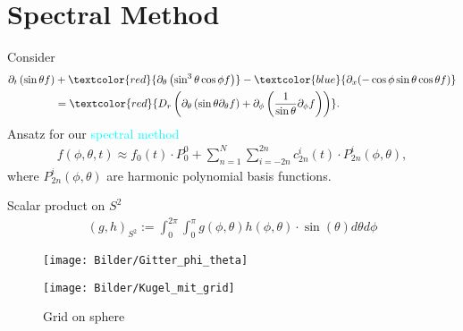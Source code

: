 \section{Spectral Method}
\begin{frame}
	\scriptsize
	Consider
\begin{align}
	\partial_{t}\left(\sin \theta f\right) &+ \textcolor{red}{\partial_\theta\left( \sin ^3 \theta \cos \phi f\right)} - \textcolor{blue}{\partial_x(-\cos\phi \sin\theta \cos\theta f)} \\
	&= \textcolor{red}{D_{r}\left(\partial_\theta \left(\sin \theta \partial_\theta f\right)+ \partial_\phi\left(\frac{1}{\sin \theta} \partial_\phi f\right)\right)}. \nonumber 
\end{align}
	\vspace{12pt}
    \pause
     Ansatz for our \textcolor{cyan}{spectral method}
\begin{align}
	f(\phi, \theta, t) \approx f_0(t) \cdot P_0^0 + \sum_{n=1}^{N} \sum_{i=-2n}^{2n} c^i_{2n}(t) \cdot P^i_{2n}(\phi, \theta), \label{ansatz}
\end{align}
    where $P^i_{2n}(\phi, \theta)$ are harmonic polynomial basis functions. 
\end{frame}



\begin{frame}
	Scalar product on $S^2$
	\begin{align*}
		(g,h)_{S^2} := \int_{0}^{2\pi} \int_{0}^{\pi} g(\phi, \theta) h(\phi, \theta) \cdot \sin(\theta) d\theta d\phi
	\end{align*}
	
	\begin{figure}
		\small
		\begin{minipage}{0.46\textwidth}
			\texttt{[image: Bilder/Gitter\_phi\_theta]}
		\end{minipage}
		\hfill 
		\begin{minipage}{0.5\textwidth}
			\texttt{[image: Bilder/Kugel\_mit\_grid]}
		\end{minipage}
		\caption{Grid on sphere}
	\end{figure}
\end{frame}



